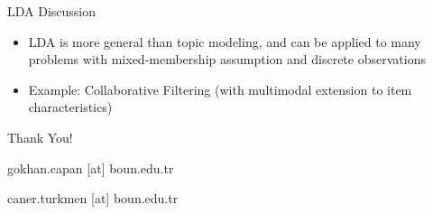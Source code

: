 \documentclass[pdf]{beamer}
\begin{document}
\begin{frame}{LDA Discussion}
\begin{itemize}
\item LDA is more general than topic modeling, and can be applied to many problems with mixed-membership assumption and discrete observations
\item Example: Collaborative Filtering (with multimodal extension to item characteristics)
\end{itemize}
\end{frame}

\begin{frame}{}
	
	Thank You!
	
	\hspace{5cm}
	
	gokhan.capan [at] boun.edu.tr
	
	caner.turkmen [at] boun.edu.tr
	
\end{frame}
{}

\end{document}
